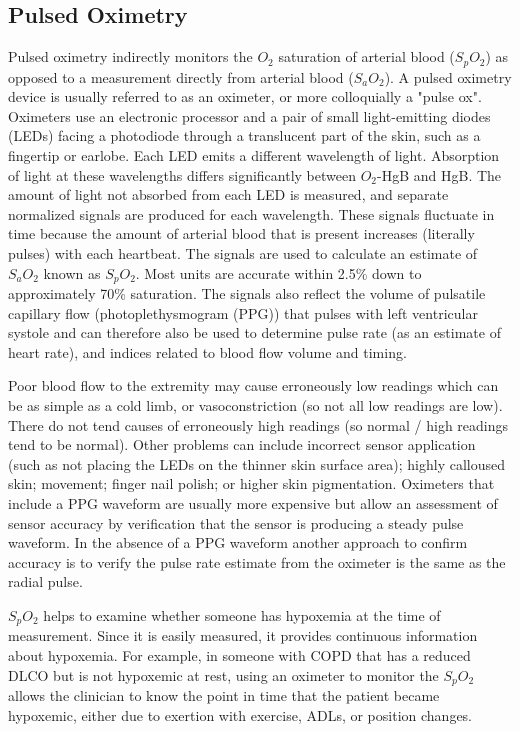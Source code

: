 \subsection{Pulsed Oximetry}

Pulsed oximetry indirectly monitors the $O_2$ saturation of arterial blood ($S_pO_2$) as opposed to a measurement directly from arterial blood ($S_aO_2$). A pulsed oximetry device is usually referred to as an oximeter, or more colloquially a "pulse ox". 
Oximeters use an electronic processor and a pair of small light-emitting diodes (LEDs) facing a photodiode through a translucent part of the skin, such as a fingertip or earlobe. Each LED emits a different wavelength of light. Absorption of light at these wavelengths differs significantly between $O_2$-HgB and HgB. The amount of light not absorbed from each LED is measured, and separate normalized signals are produced for each wavelength. These signals fluctuate in time because the amount of arterial blood that is present increases (literally pulses) with each heartbeat. The signals are used to calculate an estimate of $S_aO_2$ known as $S_pO_2$. Most units are accurate within 2.5\% down to approximately 70\% saturation. The signals also reflect the volume of pulsatile capillary flow (photoplethysmogram (PPG)) that pulses with left ventricular systole and can therefore also be used to determine pulse rate (as an estimate of heart rate), and indices related to blood flow volume and timing.

Poor blood flow to the extremity may cause erroneously low readings which can be as simple as a cold limb, or vasoconstriction (so not all low readings are low). There do not tend causes of erroneously high readings (so normal / high readings tend to be normal). Other problems can include incorrect sensor application (such as not placing the LEDs on the thinner skin surface area); highly calloused skin; movement; finger nail polish; or higher skin pigmentation. Oximeters that include a PPG waveform are usually more expensive but allow an assessment of sensor accuracy by verification that the sensor is producing a steady pulse waveform. In the absence of a PPG waveform another approach to confirm accuracy is to verify the pulse rate estimate from the oximeter is the same as the radial pulse.

$S_pO_2$ helps to examine whether someone has hypoxemia at the time of measurement. Since it is easily measured, it provides continuous information about hypoxemia. For example, in someone with COPD that has a reduced DLCO but is not hypoxemic at rest, using an oximeter to monitor the $S_pO_2$ allows the clinician to know the point in time that the patient became hypoxemic, either due to exertion with exercise, ADLs, or position changes.


